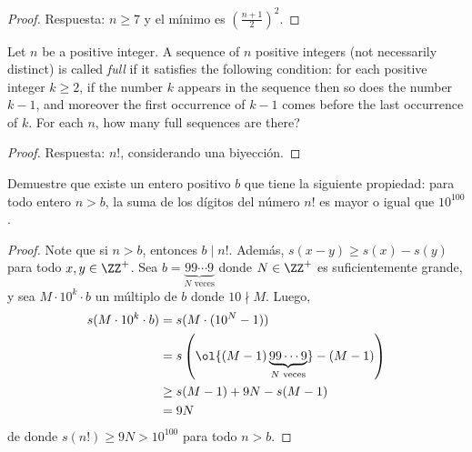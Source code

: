\begin{proof}
	Respuesta: $n\ge 7$ y el mínimo es $\left(\frac{n+1}{2}\right)^2$.
\end{proof}

\begin{probMR}
	Let $n$ be a positive integer. A sequence of $n$ positive integers (not necessarily distinct) is called \emph{full} if it satisfies the following condition: for each positive integer $k\ge 2$, if the number $k$ appears in the sequence then so does the number $k-1$, and moreover the first occurrence of $k-1$ comes before the last occurrence of $k$. For each $n$, how many full sequences are there?
\end{probMR}

\begin{proof}
	Respuesta: $n!$, considerando una biyección.
\end{proof}


\begin{probEG}
	Demuestre que existe un entero positivo $b$ que tiene la siguiente propiedad: para todo entero $n>b$, la suma de los dígitos del número $n!$ es mayor o igual que $10^{100}$.
\end{probEG}

\begin{proof}
	Note que si $n>b$, entonces $b\mid n!$. Además, $s(x-y)\ge s(x)-s(y)$ para todo $x,y\in\ZZ^+$. Sea $b=\underbrace{99\cdots 9}_{N\text{ veces}}$ donde $N\in\ZZ^+$ es suficientemente grande, y sea $M\cdot 10^k\cdot b$ un múltiplo de $b$ donde $10\nmid M$. Luego,
	\begin{align*}
		s(M\cdot 10^k\cdot b)
		&=s(M\cdot(10^N-1))\\
		&=s\left(\ol{(M-1)\underbrace{99\cdots 9}_{N\text{ veces}}}-(M-1)\right)\\
		&\ge s(M-1)+9N-s(M-1)\\
		&=9N
	\end{align*}
	de donde $s(n!)\ge 9N>10^{100}$ para todo $n>b$.
\end{proof}

